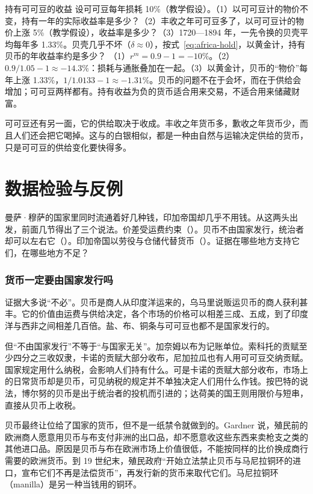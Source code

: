 \begin{example}{持有可可豆的收益}\label{ex:africa-cacao}
设可可豆每年损耗 10\%（教学假设）。（1）以可可豆计的物价不变，持有一年的实际收益率是多少？（2）丰收之年可可豆多了，以可可豆计的物价上涨 5\%（教学假设），收益率是多少？（3）1720—1894 年，一先令换的贝壳平均每年多 1.33\%。贝壳几乎不坏（$\delta\approx0$），按式~\eqref{eq:africa-hold}，以黄金计，持有贝币的年收益率约是多少？
\solution （1）$r^{m}=0.9-1=-10\%$。（2）$0.9/1.05-1\approx-14.3\%$：损耗与通胀叠加在一起。（3）以黄金计，贝币的“物价”每年上涨 1.33\%，$1/1.0133-1\approx-1.31\%$。贝币的问题不在于会坏，而在于供给会增加；可可豆两样都有。持有收益为负的货币适合用来交易，不适合用来储藏财富。
\end{example}

可可豆还有另一面，它的供给取决于收成。丰收之年货币多，歉收之年货币少，而且人们还会把它喝掉。这与的白银相似，都是一种由自然与运输决定供给的货币，只是可可豆的供给变化要快得多。

\section{数据检验与反例}\label{sec:africa-test}

曼萨·穆萨的国家里同时流通着好几种钱，印加帝国却几乎不用钱。从这两头出发，前面几节得出了三个说法。价差受运费约束（）。贝币不由国家发行，统治者却可以左右它（）。印加帝国以劳役与仓储代替货币（）。证据在哪些地方支持它们，在哪些地方不足？

\subsubsection{货币一定要由国家发行吗}
证据大多说“不必”。贝币是商人从印度洋运来的，乌马里说贩运贝币的商人获利甚丰。它的价值由运费与供给决定，各个市场的价格可以相差三成、五成，到了印度洋与西非之间相差几百倍。盐、布、铜条与可可豆也都不是国家发行的。

但“不由国家发行”不等于“与国家无关”。加奈姆以布为记账单位。索科托的贡赋至少四分之三收奴隶，卡诺的贡赋大部分收布，尼加拉瓜也有人用可可豆交纳贡赋。国家规定用什么纳税，会影响人们持有什么。可是卡诺的贡赋大部分收布，市场上的日常货币却是贝币，可见纳税的规定并不单独决定人们用什么作钱。按巴特的说法，博尔努的贝币是出于统治者的投机而引进的；达荷美的国王则用限价与短串，直接从贝币上收税。

贝币最终让位给了国家的货币，但不是一纸禁令就做到的。Gardner 说，殖民前的欧洲商人愿意用贝币与布支付非洲的出口品，却不愿意收这些东西来卖枪支之类的其他进口品。原因是贝币与布在欧洲市场上价值很低，不能按同样的比价换成商行需要的欧洲货币。到 19 世纪末，殖民政府“开始立法禁止贝币与马尼拉铜环的进口，宣布它们不再是法偿货币”，再发行新的货币来取代它们\cite{gardner2015}。马尼拉铜环（manilla）是另一种当钱用的铜环。

